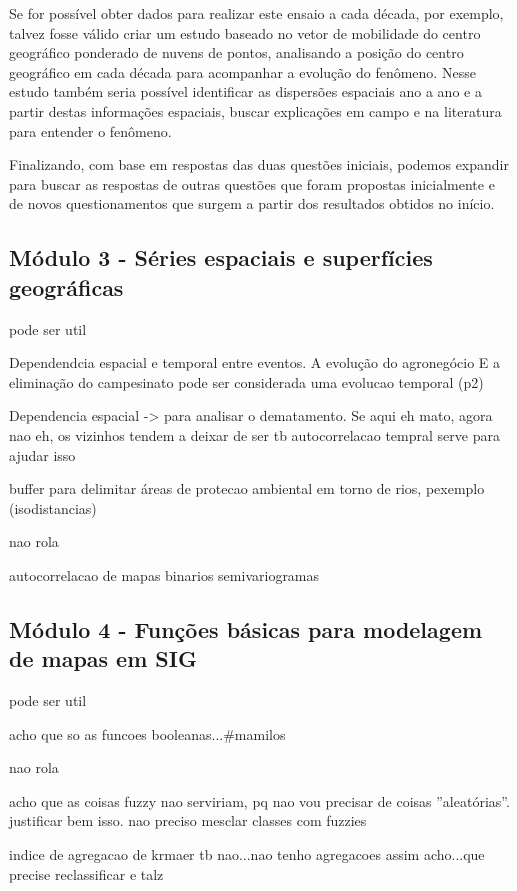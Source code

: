 Se for possível obter dados para realizar este ensaio a cada década, por exemplo, talvez fosse válido criar um estudo baseado no vetor de mobilidade do centro geográfico ponderado de nuvens de pontos, analisando a posição do centro geográfico em cada década para acompanhar a evolução do fenômeno. Nesse estudo também seria possível identificar as dispersões espaciais ano a ano e a partir destas informações espaciais, buscar explicações em campo e na literatura para entender o fenômeno.

Finalizando, com base em respostas das duas questões iniciais, podemos expandir para buscar as respostas de outras questões que foram propostas inicialmente e de novos questionamentos que surgem a partir dos resultados obtidos no início.


\subsection{Módulo 3 - Séries espaciais e superfícies geográficas}

pode ser util

Dependendcia espacial e temporal entre eventos. 
A evolução do agronegócio E a eliminação do campesinato pode ser considerada uma evolucao temporal (p2)

Dependencia espacial -> para analisar o dematamento. Se aqui eh mato, agora nao eh, os vizinhos tendem a deixar de ser tb
autocorrelacao tempral serve para ajudar isso

buffer para delimitar áreas de protecao ambiental em torno de rios, pexemplo (isodistancias)


nao rola

autocorrelacao de mapas binarios
semivariogramas

\subsection{Módulo 4 - Funções básicas para modelagem de mapas em SIG}

pode ser util

acho que so as funcoes booleanas...\#mamilos

nao rola

acho que as coisas fuzzy nao serviriam, pq nao vou precisar de coisas ''aleatórias''. justificar bem isso. nao preciso mesclar classes com fuzzies

indice de agregacao de krmaer tb nao...nao tenho agregacoes assim acho...que precise reclassificar e talz

